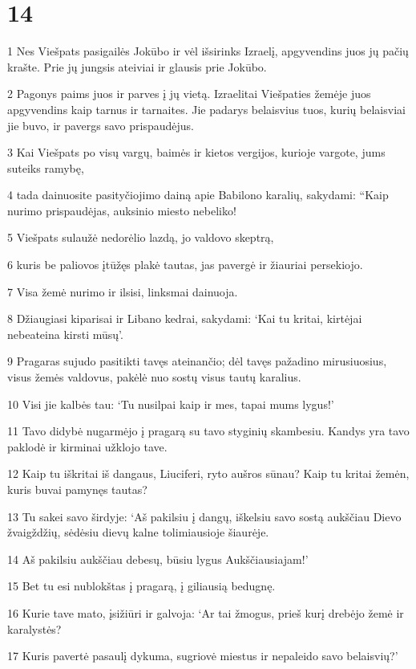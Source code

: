 \chapter{14}


\par 1 Nes Viešpats pasigailės Jokūbo ir vėl išsirinks Izraelį, apgyvendins juos jų pačių krašte. Prie jų jungsis ateiviai ir glausis prie Jokūbo. 
\par 2 Pagonys paims juos ir parves į jų vietą. Izraelitai Viešpaties žemėje juos apgyvendins kaip tarnus ir tarnaites. Jie padarys belaisvius tuos, kurių belaisviai jie buvo, ir pavergs savo prispaudėjus. 
\par 3 Kai Viešpats po visų vargų, baimės ir kietos vergijos, kurioje vargote, jums suteiks ramybę, 
\par 4 tada dainuosite pasityčiojimo dainą apie Babilono karalių, sakydami: “Kaip nurimo prispaudėjas, auksinio miesto nebeliko! 
\par 5 Viešpats sulaužė nedorėlio lazdą, jo valdovo skeptrą, 
\par 6 kuris be paliovos įtūžęs plakė tautas, jas pavergė ir žiauriai persekiojo. 
\par 7 Visa žemė nurimo ir ilsisi, linksmai dainuoja. 
\par 8 Džiaugiasi kiparisai ir Libano kedrai, sakydami: ‘Kai tu kritai, kirtėjai nebeateina kirsti mūsų’. 
\par 9 Pragaras sujudo pasitikti tavęs ateinančio; dėl tavęs pažadino mirusiuosius, visus žemės valdovus, pakėlė nuo sostų visus tautų karalius. 
\par 10 Visi jie kalbės tau: ‘Tu nusilpai kaip ir mes, tapai mums lygus!’ 
\par 11 Tavo didybė nugarmėjo į pragarą su tavo styginių skambesiu. Kandys yra tavo paklodė ir kirminai užklojo tave. 
\par 12 Kaip tu iškritai iš dangaus, Liuciferi, ryto aušros sūnau? Kaip tu kritai žemėn, kuris buvai pamynęs tautas? 
\par 13 Tu sakei savo širdyje: ‘Aš pakilsiu į dangų, iškelsiu savo sostą aukščiau Dievo žvaigždžių, sėdėsiu dievų kalne tolimiausioje šiaurėje. 
\par 14 Aš pakilsiu aukščiau debesų, būsiu lygus Aukščiausiajam!’ 
\par 15 Bet tu esi nublokštas į pragarą, į giliausią bedugnę. 
\par 16 Kurie tave mato, įsižiūri ir galvoja: ‘Ar tai žmogus, prieš kurį drebėjo žemė ir karalystės? 
\par 17 Kuris pavertė pasaulį dykuma, sugriovė miestus ir nepaleido savo belaisvių?’ 
